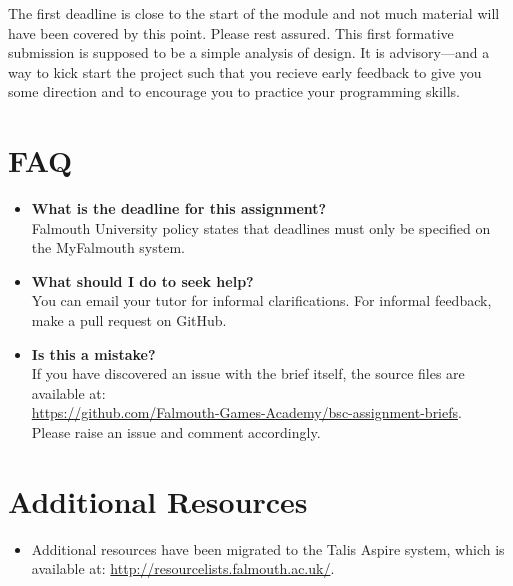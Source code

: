 \documentclass{../../fal_assignment}
\begin{document}
The first deadline is  close to the start of the module and not much material will have been covered by this point. Please rest assured. This first formative submission is supposed to be a simple analysis of design. It is advisory---and a way to kick start the project such that you recieve early feedback to give you some direction and to encourage you to practice your programming skills.

\section*{FAQ}

\begin{itemize}
	\item 	\textbf{What is the deadline for this assignment?} \\ 
    		Falmouth University policy states that deadlines must only be specified on the MyFalmouth system.
    		
	\item 	\textbf{What should I do to seek help?} \\ 
    		You can email your tutor for informal clarifications. For informal feedback, make a pull request on GitHub. 
    		
    	\item 	\textbf{Is this a mistake?} \\ 	
    		If you have discovered an issue with the brief itself, the source files are available at: \\
    		\url{https://github.com/Falmouth-Games-Academy/bsc-assignment-briefs}.\\
    		 Please raise an issue and comment accordingly.
\end{itemize}

\section*{Additional Resources}

\begin{itemize}
    \item Additional resources have been migrated to the Talis Aspire system, which is available at: \url{http://resourcelists.falmouth.ac.uk/}.
\end{itemize}
\end{document}

